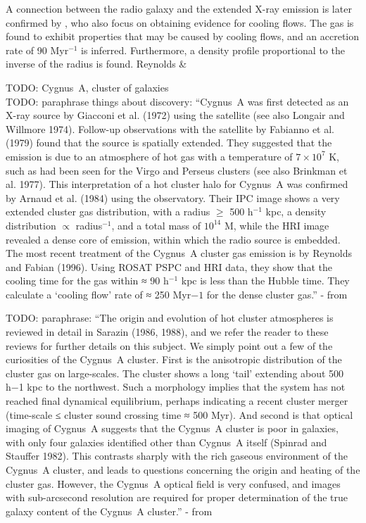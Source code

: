 \documentclass[MScProj_TLRH_ClusterEnergy.tex]{subfiles}
\begin{document}
A connection between the radio galaxy and the extended X-ray emission is later confirmed by \citet{1984MNRAS.211..981A}, who also focus on obtaining evidence for cooling flows. The gas is found to exhibit properties that may be caused by cooling flows, and an accretion rate of 90 M\Sun yr$^{-1}$ is inferred. Furthermore, a density profile proportional to the inverse of the radius is found. Reynolds \&



TODO: Cygnus~A, cluster of galaxies \\

TODO: paraphrase things about discovery: ``Cygnus~A was first detected as an X-ray source by Giacconi et al. (1972) using the  satellite (see also Longair and Willmore 1974). Follow-up observations with the  satellite by Fabianno et al. (1979) found that the source is spatially extended. They suggested that the emission is due to an atmosphere of hot gas with a temperature of $7 \times 10^7$ K, such as had been seen for the Virgo and Perseus clusters (see also Brinkman et al. 1977). This interpretation of a hot cluster halo for Cygnus~A was confirmed by Arnaud et al. (1984) using the  observatory. Their IPC image shows a very extended cluster gas distribution, with a radius $\geq$ 500 h$^{−1}$ kpc, a density distribution $\propto$ radius$^{−1}$, and a total mass of $10^{14}$ M\Sun, while the  HRI image revealed a dense core of emission, within which the radio source is embedded. The most recent treatment of the Cygnus~A cluster gas emission is by Reynolds and Fabian (1996). Using ROSAT PSPC and HRI data, they show that the cooling time for the gas within ≈ 90 h$^{−1}$ kpc is less than the Hubble time. They calculate a `cooling flow' rate of ≈ 250 M\Sun yr${−1}$ for the dense cluster gas.'' - from  \citep{1996A&ARv...7....1C}

TODO: paraphrase: ``The origin and evolution of hot cluster atmospheres is reviewed in detail in Sarazin (1986, 1988), and we refer the reader to these reviews for further details on this subject. We simply point out a few of the curiosities of the Cygnus~A cluster. First is the anisotropic distribution of the cluster gas on large-scales. The cluster shows a long ‘tail’ extending about 500 h−1 kpc to the northwest. Such a morphology implies that the system has not reached final dynamical equilibrium, perhaps indicating a recent cluster merger (time-scale ≤ cluster sound crossing time ≈ 500 Myr). And second is that optical imaging of Cygnus~A suggests that the Cygnus~A cluster is poor in galaxies, with only four galaxies identified other than Cygnus~A itself (Spinrad and Stauffer 1982). This contrasts sharply with the rich gaseous environment of the Cygnus~A cluster, and leads to questions concerning the origin and heating of the cluster gas. However, the Cygnus~A optical field is very confused, and images with sub-arcsecond resolution are required for proper determination of the true galaxy content of the Cygnus~A cluster.'' - from  \citep{1996A&ARv...7....1C}
\end{document}
